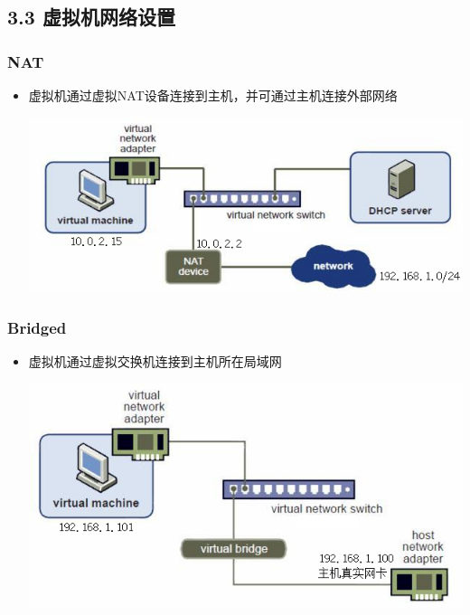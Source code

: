 \documentclass[xcolor=svgnames,bigger,presentation]{beamer}
\begin{document}
\subsection{3.3 虚拟机网络设置}
\label{sec-3-3}
\begin{frame}
\frametitle{NAT}
\label{sec-3-3-1}
\begin{itemize}

\item 虚拟机通过虚拟NAT设备连接到主机，并可通过主机连接外部网络
\label{sec-3-3-1-1}%
\begin{center}
\includegraphics[width=.9\linewidth]{img/nat.jpg}
\end{center}

\end{itemize} %
\end{frame}
\begin{frame}
\frametitle{Bridged}
\label{sec-3-3-2}
\begin{itemize}

\item 虚拟机通过虚拟交换机连接到主机所在局域网
\label{sec-3-3-2-1}%
\begin{center}
\includegraphics[width=.9\linewidth]{img/bridged.jpg}
\end{center}

\end{itemize} %
\end{frame}
\end{document}
